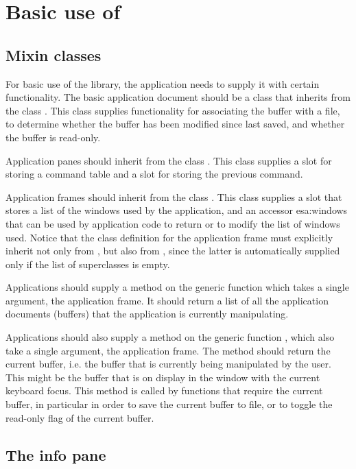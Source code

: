 \chapter{Basic use of \sysname{}}

\section{Mixin classes}

For basic use of the \sysname{} library, the application needs to supply it
with certain functionality.  The basic application document should be a
class that inherits from the class .
This class supplies functionality for associating the buffer with a
file, to determine whether the buffer has been modified since last
saved, and whether the buffer is read-only.

Application panes should inherit from the class
.  This class supplies a slot for storing a
command table and a slot for storing the previous command.

Application frames should inherit from the class
.  This class supplies a slot that stores a
list of the windows used by the application, and an accessor esa:windows
that can be used by application code to return or to modify the list of
windows used.  Notice that the class definition for the application
frame must explicitly inherit not only from , but
also from , since the latter is
automatically supplied only if the list of superclasses is empty.

Applications should supply a method on the generic function
 which takes a single argument, the application frame.
It should return a list of all the application documents (buffers) that
the application is currently manipulating.

Applications should also supply a method on the generic function
, which also take a single argument, the
application frame.  The method should return the current buffer,
i.e. the buffer that is currently being manipulated by the user.  This
might be the buffer that is on display in the window with the current
keyboard focus.  This method is called by functions that require the
current buffer, in particular in order to save the current buffer to
file, or to toggle the read-only flag of the current buffer.  

\section{The info pane}

